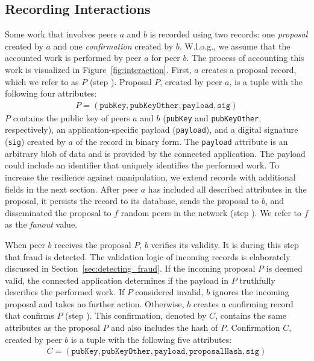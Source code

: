\subsection{Recording Interactions}
\label{sec:recording_interactions}
Some work that involves peers $ a $ and $ b $ is recorded using two records: one \emph{proposal} created by $ a $ and one \emph{confirmation} created by $ b $.
W.l.o.g., we assume that the accounted work is performed by peer $ a $ for peer $ b $.
The process of accounting this work is visualized in Figure~\ref{fig:interaction}.
First, $ a $ creates a proposal record, which we refer to as $ P $ (step ).
Proposal $ P $, created by peer $ a $, is a tuple with the following four attributes:
\begin{align*}
	P = (\texttt{pubKey}, \texttt{pubKeyOther}, \texttt{payload}, \texttt{sig})
\end{align*}
$ P $ contains the public key of peers $ a $ and $ b $ (\texttt{pubKey} and \texttt{pubKeyOther}, respectively), an application-specific payload (\texttt{payload}), and a digital signature (\texttt{sig}) created by $ a $ of the record in binary form.
The \texttt{payload} attribute is an arbitrary blob of data and is provided by the connected application.
The payload could include an identifier that uniquely identifies the performed work.
To increase the resilience against manipulation, we extend records with additional fields in the next section.
After peer $ a $ has included all described attributes in the proposal, it persists the record to its database, sends the proposal to $ b $, and disseminated the proposal to $ f $ random peers in the network (step ).
We refer to $ f $ as the \emph{fanout} value.

When peer $ b $ receives the proposal $ P $, $ b $ verifies its validity.
It is during this step that fraud is detected.
The validation logic of incoming records is elaborately discussed in Section~\ref{sec:detecting_fraud}.
If the incoming proposal $ P $ is deemed valid, the connected application determines if the payload in $ P $ truthfully describes the performed work.
If $ P $ considered invalid, $ b $ ignores the incoming proposal and takes no further action.
Otherwise, $ b $ creates a confirming record that confirms $ P $ (step ).
This confirmation, denoted by $ C $, contains the same attributes as the proposal $ P $ and also includes the hash of $ P $.
Confirmation $ C $, created by peer $ b $ is a tuple with the following five attributes:
\begin{align*}
	C = (\texttt{pubKey}, \texttt{pubKeyOther}, \texttt{payload}, \texttt{proposalHash}, \texttt{sig})
\end{align*}

